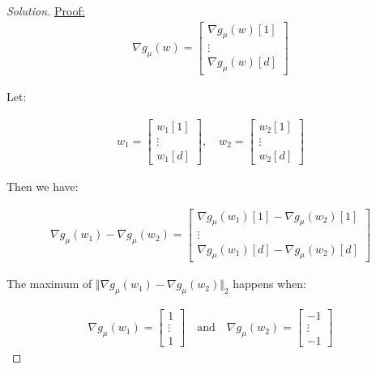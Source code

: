 \documentclass{article}
\newenvironment{solution}
  {\renewcommand\qedsymbol{$\blacksquare$}\begin{proof}[Solution]}
  {\end{proof}}
\newenvironment{claimproof}[1]{\par\noindent\underline{Proof:}\space#1}{}
\begin{document}
\begin{solution}
\begin{claimproof}
        \begin{align*}
            \nabla g_\mu(w) = \begin{bmatrix}
                \nabla g_\mu(w)[1] \\
                \vdots \\
                \nabla g_\mu(w)[d]
            \end{bmatrix}
        \end{align*}

        Let:

        \begin{align*}
            w_1 = \begin{bmatrix}
                w_1[1] \\
                \vdots \\
                w_1[d]
            \end{bmatrix}, \quad w_2 = \begin{bmatrix}
                w_2[1] \\
                \vdots \\
                w_2[d]
            \end{bmatrix}
        \end{align*}

        Then we have:

        \begin{align*}
            \nabla g_\mu(w_1) - \nabla g_\mu(w_2) 
            = \begin{bmatrix}
                \nabla g_\mu(w_1)[1] - \nabla g_\mu(w_2)[1] \\
                \vdots \\
                \nabla g_\mu(w_1)[d] - \nabla g_\mu(w_2)[d]
            \end{bmatrix}
        \end{align*}

        The maximum of $\Vert \nabla g_\mu(w_1) - \nabla g_\mu(w_2) \Vert_2$ happens when:

        \begin{align*}
            \nabla g_\mu(w_1) = \begin{bmatrix}
                1 \\
                \vdots \\
                1
            \end{bmatrix}
            \quad \text{and} \quad
            \nabla g_\mu(w_2) = \begin{bmatrix}
                -1 \\
                \vdots \\
                -1
            \end{bmatrix}
        \end{align*}


\end{claimproof}
\end{solution}
\end{document}
